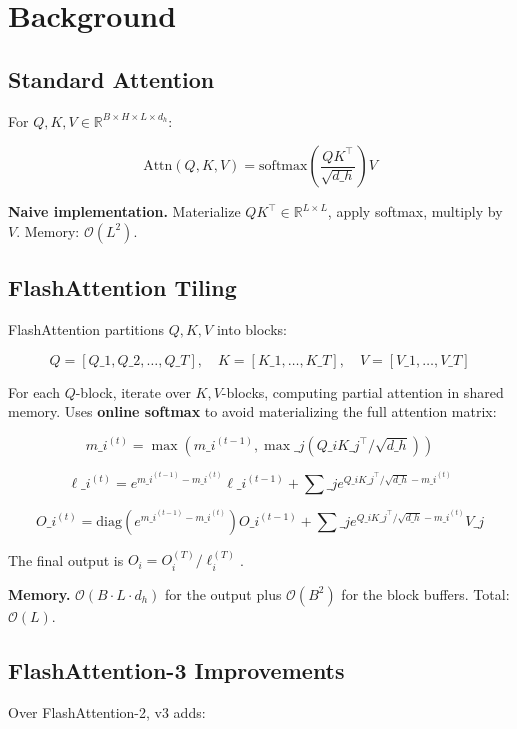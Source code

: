 \section{Background}

\subsection{Standard Attention}

For $Q, K, V \in \mathbb{R}^{B \times H \times L \times d_h}$:

\[
\text{Attn}(Q, K, V) = \text{softmax}\!\left(\frac{Q K^\top}{\sqrt{d\_h}}\right) V
\tag{3.1}
\]

\textbf{Naive implementation.} Materialize $QK^\top \in \mathbb{R}^{L \times L}$, 
apply softmax, multiply by $V$. Memory: $\mathcal{O}(L^2)$.

\subsection{FlashAttention Tiling}

FlashAttention partitions $Q, K, V$ into blocks:

\[
Q = [Q\_1, Q\_2, \dots, Q\_T], \quad K = [K\_1, \dots, K\_T], \quad V = [V\_1, \dots, V\_T]
\tag{3.2}
\]

For each $Q$-block, iterate over $K, V$-blocks, computing partial attention 
in shared memory. Uses \textbf{online softmax} to avoid materializing the full 
attention matrix:

\[
m\_i^{(t)} = \max(m\_i^{(t-1)}, \max\_j (Q\_i K\_j^\top / \sqrt{d\_h}))
\tag{3.3}
\]

\[
\ell\_i^{(t)} = e^{m\_i^{(t-1)} - m\_i^{(t)}} \ell\_i^{(t-1)} + \sum\_j e^{Q\_i K\_j^\top / \sqrt{d\_h} - m\_i^{(t)}}
\tag{3.4}
\]

\[
O\_i^{(t)} = \text{diag}(e^{m\_i^{(t-1)} - m\_i^{(t)}}) O\_i^{(t-1)} + \sum\_j e^{Q\_i K\_j^\top / \sqrt{d\_h} - m\_i^{(t)}} V\_j
\tag{3.5}
\]

The final output is $O_i = O_i^{(T)} / \ell_i^{(T)}$.

\textbf{Memory.} $\mathcal{O}(B \cdot L \cdot d_h)$ for the output plus 
$\mathcal{O}(B^2)$ for the block buffers. Total: $\mathcal{O}(L)$.

\subsection{FlashAttention-3 Improvements}

Over FlashAttention-2, v3 adds:

